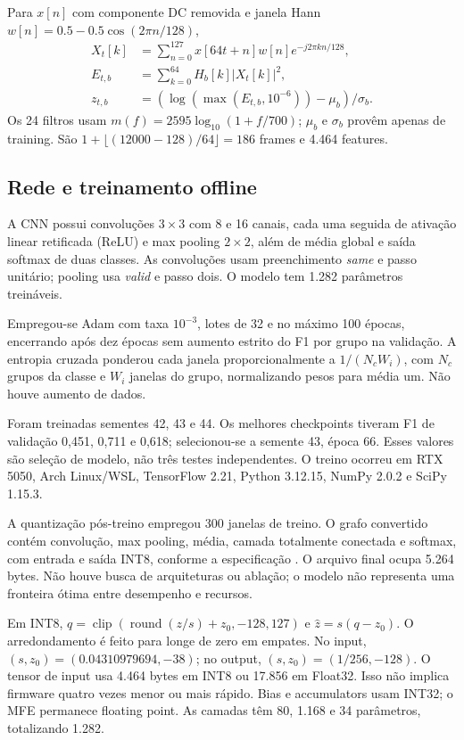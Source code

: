 \documentclass[9pt,twocolumn,twoside,lineno]{MSBJournal}
\begin{document}
Para $x[n]$ com componente DC removida e janela Hann $w[n]=0.5-0.5\cos(2\pi n/128)$,
\begin{align}
X_t[k]&=\sum_{n=0}^{127}x[64t+n]w[n]e^{-j2\pi kn/128},\\
E_{t,b}&=\sum_{k=0}^{64}H_b[k]|X_t[k]|^2,\\
z_{t,b}&=(\log(\max(E_{t,b},10^{-6}))-\mu_b)/\sigma_b.
\end{align}
Os 24 filtros usam $m(f)=2595\log_{10}(1+f/700)$; $\mu_b$ e $\sigma_b$ provêm apenas de training. São $1+\lfloor(12000-128)/64\rfloor=186$ frames e 4.464 features.

\subsection{Rede e treinamento offline}
A CNN possui convoluções $3\times3$ com 8 e 16 canais, cada uma seguida de ativação linear retificada (ReLU) e max pooling $2\times2$, além de média global e saída softmax de duas classes. As convoluções usam preenchimento \textit{same} e passo unitário; pooling usa \textit{valid} e passo dois. O modelo tem 1.282 parâmetros treináveis.

Empregou-se Adam com taxa $10^{-3}$, lotes de 32 e no máximo 100 épocas, encerrando após dez épocas sem aumento estrito do F1 por grupo na validação. A entropia cruzada ponderou cada janela proporcionalmente a $1/(N_cW_i)$, com $N_c$ grupos da classe e $W_i$ janelas do grupo, normalizando pesos para média um. Não houve aumento de dados.

Foram treinadas sementes 42, 43 e 44. Os melhores checkpoints tiveram F1 de validação 0,451, 0,711 e 0,618; selecionou-se a semente 43, época 66. Esses valores são seleção de modelo, não três testes independentes. O treino ocorreu em RTX 5050, Arch Linux/WSL, TensorFlow 2.21, Python 3.12.15, NumPy 2.0.2 e SciPy 1.15.3.

A quantização pós-treino empregou 300 janelas de treino. O grafo convertido contém convolução, max pooling, média, camada totalmente conectada e softmax, com entrada e saída INT8, conforme a especificação \citep{int8spec}. O arquivo final ocupa 5.264 bytes. Não houve busca de arquiteturas ou ablação; o modelo não representa uma fronteira ótima entre desempenho e recursos.

Em INT8, $q=\operatorname{clip}(\operatorname{round}(z/s)+z_0,-128,127)$ e $\hat z=s(q-z_0)$. O arredondamento é feito para longe de zero em empates. No input, $(s,z_0)=(0.04310979694,-38)$; no output, $(s,z_0)=(1/256,-128)$. O tensor de input usa 4.464 bytes em INT8 ou 17.856 em Float32. Isso não implica firmware quatro vezes menor ou mais rápido. Bias e accumulators usam INT32; o MFE permanece floating point. As camadas têm 80, 1.168 e 34 parâmetros, totalizando 1.282.
\end{document}
